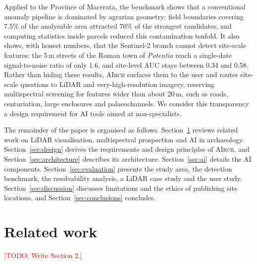 \documentclass[preprint,12pt,authoryear]{elsarticle}
\newcommand{\airch}{\textsc{AIrch}}
\newcommand{\todo}[1]{\textcolor{red}{[TODO: #1]}}
\begin{document}
Applied to the Province of Macerata, the benchmark shows that a conventional anomaly pipeline is dominated by agrarian geometry: field boundaries covering 7.5\% of the analysable area attracted 70\% of the strongest candidates, and computing statistics inside parcels reduced this contamination tenfold. It also shows, with honest numbers, that the Sentinel-2 branch cannot detect site-scale features: the 5\,m streets of the Roman town of \textit{Potentia} reach a single-date signal-to-noise ratio of only 1.6, and site-level AUC stays between 0.34 and 0.58. Rather than hiding these results, \airch{} surfaces them to the user and routes site-scale questions to LiDAR and very-high-resolution imagery, reserving multispectral screening for features wider than about 20\,m, such as roads, centuriation, large enclosures and palaeochannels. We consider this transparency a design requirement for AI tools aimed at non-specialists.

The remainder of the paper is organised as follows. Section~\ref{sec:related} reviews related work on LiDAR visualisation, multispectral prospection and AI in archaeology. Section~\ref{sec:design} derives the requirements and design principles of \airch{}, and Section~\ref{sec:architecture} describes its architecture. Section~\ref{sec:ai} details the AI components. Section~\ref{sec:evaluation} presents the study area, the detection benchmark, the resolvability analysis, a LiDAR case study and the user study. Section~\ref{sec:discussion} discusses limitations and the ethics of publishing site locations, and Section~\ref{sec:conclusions} concludes.


\section{Related work}
\label{sec:related}
\todo{Write Section 2.}
\end{document}
